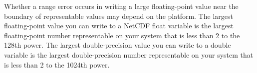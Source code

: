 Whether a range error occurs in writing a large floating-point value near the boundary of representable values may depend on the platform. The largest floating-point value you can write to a NetCDF float variable is the largest floating-point number representable on your system that is less than 2 to the 128th power. The largest double-precision value you can write to a double variable is the largest double-precision number representable on your system that is less than 2 to the 1024th power.

\begin{comment}

Tests with ESDM conversion:

\begin{verbatim}

Final Results - INT8 to FLOAT

********************************************
INT8_MAX = 127
Maximum FLOAT = 126.000000
Maximum INT8 = 126
********************************************

********************************************
INT8_MIN = -128
Minimum FLOAT = -127.000000
Minimum INT8 = -127
********************************************

Final Results - INT16 to FLOAT

********************************************
INT16_MAX = 32767
Maximum FLOAT = 32766.000000
Maximum INT16 = 32766
********************************************

********************************************
INT16_MIN = -32768
Minimum FLOAT = -32767.000000
Minimum INT16 = -32767
********************************************

Final Results - INT32 to FLOAT

********************************************
INT32_MAX = 2147483647
Maximum FLOAT = 2147483520.000000
Maximum INT32 = 2147483583
********************************************

********************************************
INT32_MIN = -2147483648
Minimum FLOAT = -2147483520.000000
Maximum INT32 = -2147483583
********************************************

Final Results - INT64 to FLOAT

********************************************
INT64_MAX = 9223372036854775807
Maximum FLOAT = 9223371487098961920.000000
Maximum INT64 = 9223371761976865807
********************************************

********************************************
INT64_MIN = -9223372036854775808
Minimum FLOAT = -9223371487098961920.000000
Minimum INT64 = -9223371761976865808
********************************************


\end{comment}
